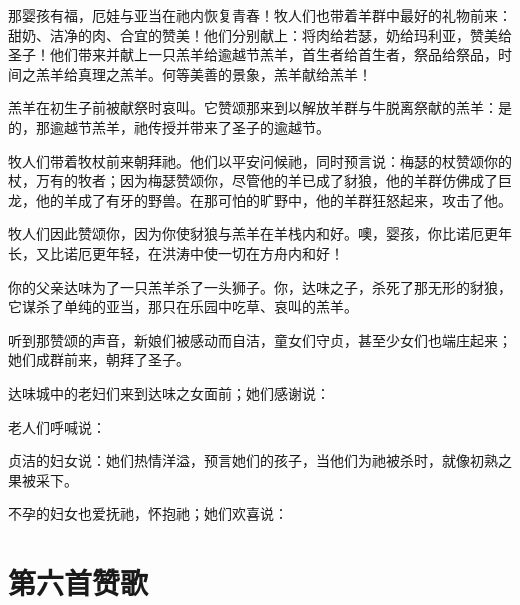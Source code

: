 那婴孩有福，厄娃与亚当在祂内恢复青春！牧人们也带着羊群中最好的礼物前来：甜奶、洁净的肉、合宜的赞美！他们分别献上：将肉给若瑟，奶给玛利亚，赞美给圣子！他们带来并献上一只羔羊给逾越节羔羊，首生者给首生者，祭品给祭品，时间之羔羊给真理之羔羊。何等美善的景象，羔羊献给羔羊！\par

羔羊在初生子前被献祭时哀叫。它赞颂那来到以解放羊群与牛脱离祭献的羔羊：是的，那逾越节羔羊，祂传授并带来了圣子的逾越节。\par

牧人们带着牧杖前来朝拜祂。他们以平安问候祂，同时预言说：梅瑟的杖赞颂你的杖，万有的牧者；因为梅瑟赞颂你，尽管他的羊已成了豺狼，他的羊群仿佛成了巨龙，他的羊成了有牙的野兽。在那可怕的旷野中，他的羊群狂怒起来，攻击了他。\par

牧人们因此赞颂你，因为你使豺狼与羔羊在羊栈内和好。\newline{}噢，婴孩，你比诺厄更年长，又比诺厄更年轻，在洪涛中使一切在方舟内和好！\par

你的父亲达味为了一只羔羊杀了一头狮子。你，达味之子，杀死了那无形的豺狼，它谋杀了单纯的亚当，那只在乐园中吃草、哀叫的羔羊。\par

听到那赞颂的声音，新娘们被感动而自洁，童女们守贞，甚至少女们也端庄起来；她们成群前来，朝拜了圣子。\par

达味城中的老妇们来到达味之女面前；她们感谢说：\par

老人们呼喊说：\par

贞洁的妇女说：她们热情洋溢，预言她们的孩子，当他们为祂被杀时，就像初熟之果被采下。\par

不孕的妇女也爱抚祂，怀抱祂；她们欢喜说：\par


\section{第六首赞歌}


